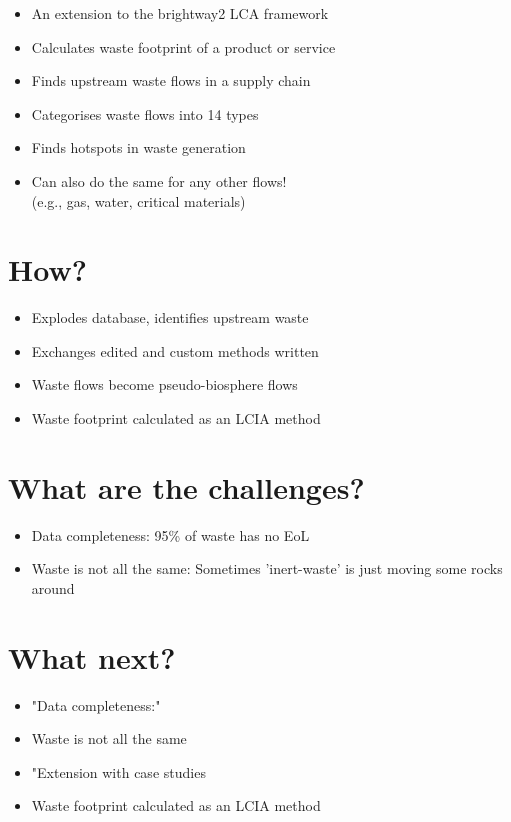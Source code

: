\documentclass[a0paper,fleqn]{betterposter}
\begin{document}
{\begin{itemize}
\item An extension to the brightway2 LCA framework
\item Calculates waste footprint of a product or service
\item Finds upstream waste flows in a supply chain
\item Categorises waste flows into 14 types
\item Finds hotspots in waste generation
\item Can also do the same for any other flows! \\(e.g., gas, water, critical materials)
\end{itemize}

\section{How?}
\begin{itemize}
    \item Explodes database, identifies upstream waste
    \item Exchanges edited and custom methods written
    \item Waste flows become pseudo-biosphere flows
    \item Waste footprint calculated as an LCIA method
\end{itemize}

\section{What are the challenges?}
\begin{itemize}
    \item Data completeness: 95\% of waste has no EoL
    \item Waste is not all the same: Sometimes 'inert-waste' is just moving some rocks around
\end{itemize}

\section{What next?}
\begin{itemize}
    \item "Data completeness:"
    \item Waste is not all the same
    \item "Extension with case studies
    \item Waste footprint calculated as an LCIA method
\end{itemize}

}
\end{document}
